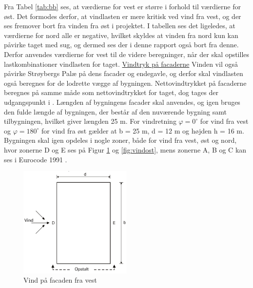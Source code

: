 Fra Tabel \ref{tab:bb} ses, at værdierne for vest er større i forhold til værdierne for øst. Det formodes derfor, at vindlasten er mere kritisk ved vind fra vest, og der ses fremover bort fra vinden fra øst i projektet. I tabellen ses det ligeledes, at værdierne for nord alle er negative, hvilket skyldes at vinden fra nord kun kan påvirke taget med sug, og dermed ses der i denne rapport også bort fra denne. 
\newline \indent{     }  Derfor anvendes værdierne for vest til de videre beregninger, når der skal opstilles lastkombinationer vindlasten for taget.
\newline
\newline
\underline{Vindtryk på facaderne}
\newline
Vinden vil også påvirke Strøybergs Palæ på dens facader og endegavle, og derfor skal vindlasten også beregnes for de lodrette vægge af bygningen.
\newline \indent{     }  Nettovindtrykket på facaderne beregnes på samme måde som nettovindtrykket for taget, dog tages der udgangspunkt i \citep[ tabel 7.1]{EU91}. Længden af bygningens facader skal anvendes, og igen bruges den fulde længde af bygningen, der består af den nuværende bygning samt tilbygningen, hvilket giver længden 25 m. 
\newline
\newline
For vindretning $\varphi = 0^{\circ}$ for vind fra vest og $\varphi = 180^{\circ}$ for vind fra øst gælder at b = 25 m, d = 12 m og højden h = 16 m. Bygningen skal igen opdeles i nogle zoner, både for vind fra vest, øst og nord, hvor zonerne D og E ses på Figur \ref{fig:vindvest} og \ref{fig:vindost}, mens zonerne A, B og C kan ses i Eurocode 1991 \citep [kapitel 7.2.2 figur 7.5]{EU91}.

\begin{figure}[htbp]
	\centering
	\includegraphics[width=0.5\textwidth]{billeder/vindvest1.png}
	\caption{Vind på facaden fra vest \citep[ 7.2.2]{EU91}}
	\label{fig:vindvest}
\end{figure}

